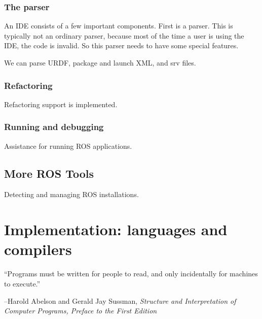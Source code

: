 \documentclass[12pt,initial,twoside,maitrise]{dms}
\numberwithin{equation}{section}
\numberwithin{table}{chapter}
\numberwithin{figure}{chapter}
\begin{document}
\subsection{The parser}

An IDE consists of a few important components. First is a parser. This is typically not an ordinary parser, because most of the time a user is using the IDE, the code is invalid. So this parser needs to have some special features.

We can parse URDF, package and launch XML, and srv files.

\subsection{Refactoring}

Refactoring support is implemented.

\subsection{Running and debugging}

Assistance for running ROS applications.

\section{More ROS Tools}

Detecting and managing ROS installations.

\chapter{Implementation: languages and compilers}\label{ch:kotlingrad}

\setlength{\epigraphwidth}{0.5\textwidth}
\epigraph{``Programs must be written for people to read, and only incidentally for machines to execute.''}{\begin{flushright}--Harold Abelson and Gerald Jay Sussman, \textit{Structure and Interpretation of Computer Programs, Preface to the First Edition~\cite{abelson1996structure}}\end{flushright}}
\end{document}
